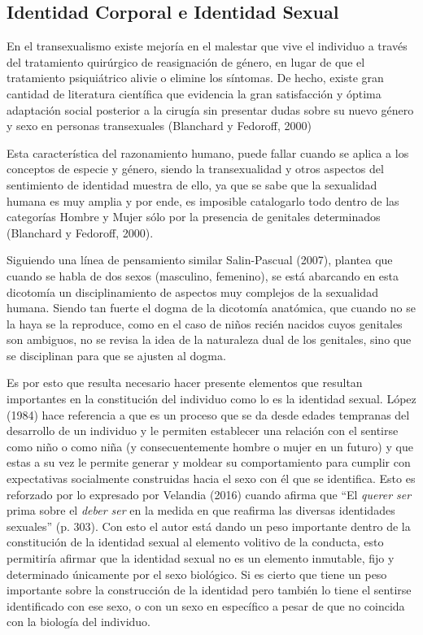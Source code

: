 \subsection{Identidad Corporal e Identidad Sexual}
En el transexualismo existe mejoría en el malestar que vive el individuo a
través del tratamiento quirúrgico de reasignación de género, en lugar de que el
tratamiento psiquiátrico alivie o elimine los síntomas.
De hecho, existe gran cantidad de literatura científica que evidencia la gran
satisfacción y óptima adaptación social posterior a la cirugía sin presentar
dudas sobre su nuevo género y sexo en personas transexuales (Blanchard y
Fedoroff, 2000)

Esta característica del razonamiento humano, puede fallar cuando se aplica a los
conceptos de especie y género, siendo la transexualidad y otros aspectos del
sentimiento de identidad muestra de ello, ya que se sabe que la sexualidad
humana es muy amplia y por ende, es imposible catalogarlo todo dentro de las
categorías Hombre y Mujer sólo por la presencia de genitales determinados
(Blanchard y Fedoroff, 2000).

Siguiendo una línea de pensamiento similar Salin-Pascual (2007), plantea que
cuando se habla de dos sexos (masculino, femenino), se está abarcando en esta
dicotomía un disciplinamiento de aspectos muy complejos de la sexualidad humana.
Siendo tan fuerte el dogma de la dicotomía anatómica, que cuando no se la haya
se la reproduce, como en el caso de niños recién nacidos cuyos genitales son
ambiguos, no se revisa la idea de la naturaleza dual de los genitales, sino que
se disciplinan para que se ajusten al dogma.

Es por esto que resulta necesario hacer presente elementos que resultan
importantes en la constitución del individuo como lo es la identidad sexual.
López (1984) hace referencia a que es un proceso que se da desde edades
tempranas del desarrollo de un individuo y le permiten establecer una relación
con el sentirse como niño o como niña (y consecuentemente hombre o mujer
en un futuro) y que estas a su vez le permite generar y moldear su
comportamiento para cumplir con expectativas socialmente construidas hacia el
sexo con él que se identifica.
Esto es reforzado por lo expresado por Velandia (2016) cuando afirma que “El
\emph{querer ser} prima sobre el \emph{deber ser} en la medida en que
reafirma las diversas identidades sexuales” (p. 303).
Con esto el autor está dando un peso importante dentro de la constitución de la
identidad sexual al elemento volitivo de la conducta, esto permitiría afirmar
que la identidad sexual no es un elemento inmutable, fijo y determinado
únicamente por el sexo biológico.
Si es cierto que tiene un peso importante sobre la construcción de la identidad
pero también lo tiene el sentirse identificado con ese sexo, o con un sexo en
específico a pesar de que no coincida con la biología del individuo.

